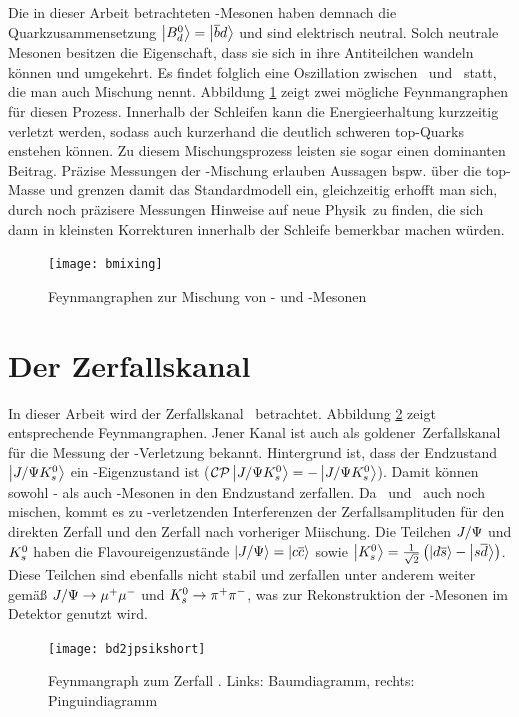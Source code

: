 Die in dieser Arbeit betrachteten \Bd-Mesonen haben demnach die Quarkzusammensetzung $\Ket{\text{$B_d^0$}} = \Ket{\overline{b}d}$ und sind elektrisch neutral. Solch neutrale Mesonen besitzen die Eigenschaft, dass sie sich in ihre Antiteilchen wandeln können und umgekehrt. Es findet folglich eine Oszillation zwischen \Bd\ und \Bdbar\ statt, die man auch Mischung nennt. Abbildung \ref{fig:bmixing} zeigt zwei mögliche Feynmangraphen für diesen Prozess. Innerhalb der Schleifen kann die Energieerhaltung kurzzeitig verletzt werden, sodass auch kurzerhand die deutlich schweren top-Quarks enstehen können. Zu diesem Mischungsprozess leisten sie sogar einen dominanten Beitrag. Präzise Messungen der \Bd-Mischung erlauben Aussagen bspw. über die top-Masse und grenzen damit das Standardmodell ein, gleichzeitig erhofft man sich, durch noch präzisere Messungen Hinweise auf \glqq neue Physik\grqq\ zu finden, die sich dann in kleinsten Korrekturen innerhalb der Schleife bemerkbar machen würden.

\begin{figure}[hptb]
\centering
\texttt{[image: bmixing]}
\caption{Feynmangraphen zur Mischung von \Bd- und \Bdbar-Mesonen}
\label{fig:bmixing}
\end{figure}


\section{Der Zerfallskanal \Decaychannel}
In dieser Arbeit wird der Zerfallskanal \Decaychannel\ betrachtet. Abbildung \ref{fig:decay} zeigt entsprechende Feynmangraphen. Jener Kanal ist auch als \glqq goldener\grqq\ Zerfallskanal für die Messung der \CP-Verletzung bekannt. Hintergrund ist, dass der Endzustand $\Ket{J/\Psi K_s^0}$ ein \CP-Eigenzustand ist ($\text{$\mathcal{CP}$}\Ket{J/\Psi K_s^0} = - \Ket{J/\Psi K_s^0}$). Damit können sowohl \Bd- als auch \Bdbar-Mesonen in den Endzustand zerfallen. Da \Bd\ und \Bdbar\ auch noch mischen, kommt es zu \CP-verletzenden Interferenzen der Zerfallsamplituden für den direkten Zerfall und den Zerfall nach vorheriger Miischung. Die Teilchen $J/\Psi$ und $K_s^0$ haben die Flavoureigenzustände $\Ket{J/\Psi} = \Ket{c\overline{c}}$ sowie $\Ket{K_s^0} = \tfrac{1}{\sqrt{2}}\left(\Ket{d\overline{s}}-\Ket{s\overline{d}}\right)$. Diese Teilchen sind ebenfalls nicht stabil und zerfallen unter anderem weiter gemäß $J/\Psi \rightarrow \mu^+\mu^-$ und $K_s^0 \rightarrow \pi^+\pi^-$, was zur Rekonstruktion der \Bd-Mesonen im Detektor genutzt wird.

\begin{figure}[hptb]
\centering
\texttt{[image: bd2jpsikshort]}
\caption{Feynmangraph zum Zerfall \Decaychannel. Links: Baumdiagramm, rechts: Pinguindiagramm}
\label{fig:decay}
\end{figure}

